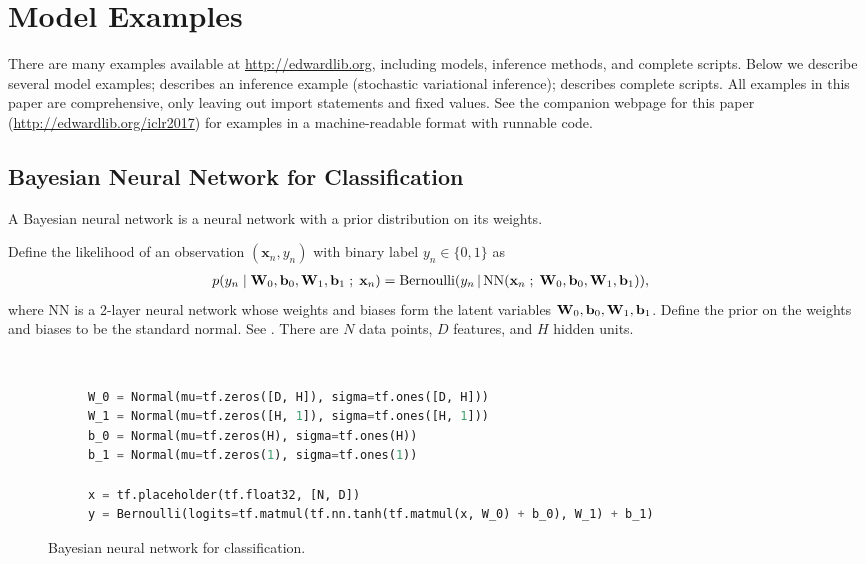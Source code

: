 \section{Model Examples}
\label{appendix:model}

There are many examples available at \url{http://edwardlib.org},
including models, inference methods, and complete scripts.
Below we describe several model examples; 
describes an inference example (stochastic variational inference);
 describes complete scripts.
All examples in this paper are comprehensive, only leaving out import
statements and fixed values.
See the companion webpage for this paper
(\url{http://edwardlib.org/iclr2017}) for examples in a
machine-readable format with
runnable code.

\subsection{Bayesian Neural Network for Classification}
\label{appendix:bnn}

A Bayesian neural network is a neural network with a prior
distribution on its weights.

Define the likelihood of an observation $(\mathbf{x}_n, y_n)$ with
binary label $y_n\in\{0,1\}$ as
\begin{align*}
  p(y_n \mid \boldsymbol{\mathbf{W}}_0, \boldsymbol{\mathbf{b}}_0, \boldsymbol{\mathbf{W}}_1, \boldsymbol{\mathbf{b}}_1 \;;\; \mathbf{x}_n)
  &=
  \operatorname{Bernoulli}(y_n \,|\, \mathrm{NN}(\mathbf{x}_n\;;\;
  \boldsymbol{\mathbf{W}}_0, \boldsymbol{\mathbf{b}}_0, \boldsymbol{\mathbf{W}}_1, \boldsymbol{\mathbf{b}}_1)),
\end{align*}
where $\mathrm{NN}$ is a 2-layer neural network whose weights and biases form
the latent variables $\boldsymbol{\mathbf{W}}_0, \boldsymbol{\mathbf{b}}_0, \boldsymbol{\mathbf{W}}_1, \boldsymbol{\mathbf{b}}_1$.
Define the prior on the weights and biases to be the standard normal.
See . There are $N$ data points, $D$ features, and $H$
hidden units.

\begin{figure}[tb]
\begin{subfigure}{\columnwidth}
  \centering
  
\end{subfigure}%
\\
\begin{subfigure}{\columnwidth}
\begin{lstlisting}[language=python]
W_0 = Normal(mu=tf.zeros([D, H]), sigma=tf.ones([D, H]))
W_1 = Normal(mu=tf.zeros([H, 1]), sigma=tf.ones([H, 1]))
b_0 = Normal(mu=tf.zeros(H), sigma=tf.ones(H))
b_1 = Normal(mu=tf.zeros(1), sigma=tf.ones(1))

x = tf.placeholder(tf.float32, [N, D])
y = Bernoulli(logits=tf.matmul(tf.nn.tanh(tf.matmul(x, W_0) + b_0), W_1) + b_1)
\end{lstlisting}
\end{subfigure}
\caption{Bayesian neural network for classification.}
\label{fig:bnn}
\end{figure}

